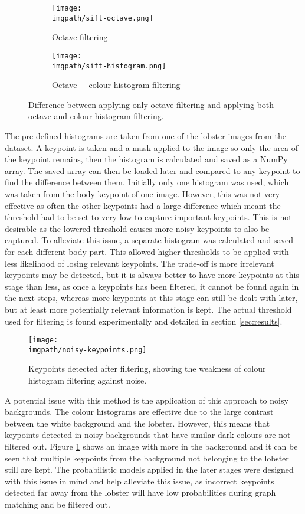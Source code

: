 \begin{figure}[H]
	\begin{subfigure}{0.5\textwidth}
	\texttt{[image: \\imgpath/sift-octave.png]}
	\caption{Octave filtering}
	\end{subfigure}
	\hspace*{\fill}
	\begin{subfigure}{0.5\textwidth}
	\texttt{[image: \\imgpath/sift-histogram.png]}
	\caption{Octave + colour histogram filtering}
	\end{subfigure}
\caption{Difference between applying only octave filtering and applying both octave and colour histogram filtering.}
\end{figure}
\noindent
The pre-defined histograms are taken from one of the lobster images from the dataset. A keypoint is taken and a mask applied to the image so only the area of the keypoint remains, then the histogram is calculated and saved as a NumPy array. The saved array can then be loaded later and compared to any keypoint to find the difference between them. Initially only one histogram was used, which was taken from the body keypoint of one image. However, this was not very effective as often the other keypoints had a large difference which meant the threshold had to be set to very low to capture important keypoints. This is not desirable as the lowered threshold causes more noisy keypoints to also be captured. To alleviate this issue, a separate histogram was calculated and saved for each different body part. This allowed higher thresholds to be applied with less likelihood of losing relevant keypoints. The trade-off is more irrelevant keypoints may be detected, but it is always better to have more keypoints at this stage than less, as once a keypoints has been filtered, it cannot be found again in the next steps, whereas more keypoints at this stage can still be dealt with later, but at least more potentially relevant information is kept. The actual threshold used for filtering is found experimentally and detailed in section \ref{sec:results}.
\begin{figure}[H]
\centering
\texttt{[image: \\imgpath/noisy-keypoints.png]}
\caption{Keypoints detected after filtering, showing the weakness of colour histogram filtering against noise.}
\label{fig:noisy-histogram}
\end{figure}
\noindent
A potential issue with this method is the application of this approach to noisy backgrounds. The colour histograms are effective due to the large contrast between the white background and the lobster. However, this means that keypoints detected in noisy backgrounds that have similar dark colours are not filtered out. Figure \ref{fig:noisy-histogram} shows an image with more in the background and it can be seen that multiple keypoints from the background not belonging to the lobster still are kept. The probabilistic models applied in the later stages were designed with this issue in mind and help alleviate this issue, as incorrect keypoints detected far away from the lobster will have low probabilities during graph matching and be filtered out. 

